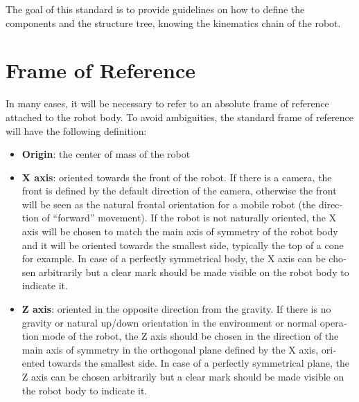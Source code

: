 \documentclass[a4paper]{article}
\newcommand\liststyleWWviiiNumxi{%
\renewcommand\labelitemi{[F0B7?]}
\renewcommand\labelitemii{o}
\renewcommand\labelitemiii{[F0A7?]}
\renewcommand\labelitemiv{[F0B7?]}
}
\begin{document}
{\sffamily
The goal of this standard is to provide guidelines on how to define the
components and the structure tree, knowing the kinematics chain of the
robot.}

\section[Frame of Reference]{ Frame of
Reference}
{\sffamily
In many cases, it will be necessary to refer to an absolute frame of
reference attached to the robot body. To avoid ambiguities, the
standard frame of reference will have the following definition:}



\begin{figure}

\end{figure}
\liststyleWWviiiNumxi
\begin{itemize}
\item {
\foreignlanguage{english}{\textsf{\textbf{Origin}}}\foreignlanguage{english}{\textsf{:
the center of mass of the robot}}}
\end{itemize}
\liststyleWWviiiNumxi
\begin{itemize}
\item {
\foreignlanguage{english}{\textsf{\textbf{X
axis}}}\foreignlanguage{english}{\textsf{: oriented towards the front
of the robot. If there is a camera, the front is defined by the default
direction of the camera, otherwise the front will be seen as the
natural frontal orientation for a mobile robot (the direction of
“forward” movement). If the robot is not naturally oriented, the X axis
will be chosen to match the main axis of symmetry of the robot body and
it will be oriented towards the smallest side, typically the top of a
cone for example. }}\foreignlanguage{english}{\textsf{In case of a
perfectly symmetrical body, the X axis can be chosen arbitrarily but a
clear mark should be made visible on the robot body to indicate it.}}}
\end{itemize}
\liststyleWWviiiNumxi
\begin{itemize}
\item {
\foreignlanguage{english}{\textsf{\textbf{Z
axis}}}\foreignlanguage{english}{\textsf{: oriented in the opposite
direction from the gravity. If there is no gravity or natural up/down
orientation in the environment or normal operation mode of the robot,
the Z axis should be chosen in the direction of the main axis of
symmetry in the orthogonal plane defined by the X axis, oriented
towards the smallest side. In case of a perfectly symmetrical plane,
the Z axis can be chosen arbitrarily but a clear mark should be made
visible on the robot body to indicate it.}}}
\end{itemize}
\end{document}
